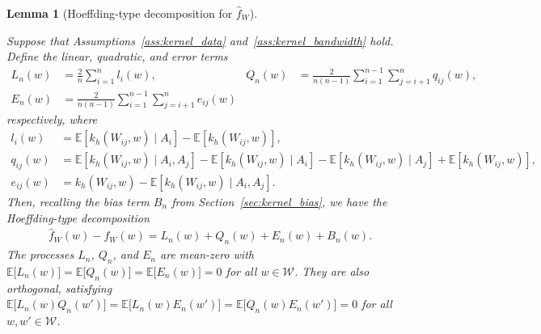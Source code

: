 \documentclass[11pt,lof]{puthesis}
\newcommand{\E}{\ensuremath{\mathbb{E}}}
\newcommand{\cW}{\ensuremath{\mathcal{W}}}
\theoremstyle{break}
\newtheorem{lemma}{Lemma}[section]
\theoremstyle{proof}
\begin{document}
\begin{lemma}[Hoeffding-type decomposition for $\hat f_W$]
\label{lem:kernel_hoeffding}

Suppose that Assumptions~\ref{ass:kernel_data} and~\ref{ass:kernel_bandwidth}
hold. Define the linear, quadratic, and error terms
%
\begin{align*}
L_n(w)
&=
\frac{2}{n} \sum_{i=1}^n l_i(w),
&Q_n(w) &= \frac{2}{n(n-1)} \sum_{i=1}^{n-1} \sum_{j=i+1}^{n} q_{i j}(w), \\
E_n(w) &= \frac{2}{n(n-1)} \sum_{i=1}^{n-1} \sum_{j=i+1}^{n} e_{i j}(w)
\end{align*}
%
respectively, where
%
\begin{align*}
l_i(w)
&=
\E\left[k_h(W_{i j},w) \mid A_i\right] - \E\left[k_h(W_{i j},w)\right], \\
q_{i j}(w)
&=
\E\left[k_h(W_{i j},w) \mid A_i, A_j\right]
- \E\left[k_h(W_{i j},w) \mid A_i\right]
- \E\left[k_h(W_{i j},w) \mid A_j\right]
+ \E\left[k_h(W_{i j},w)\right], \\
e_{i j}(w)
&=
k_h(W_{i j},w) - \E\left[k_h(W_{i j},w) \mid A_i, A_j\right].
\end{align*}
%
Then, recalling the bias term $B_n$ from Section~\ref{sec:kernel_bias},
we have the Hoeffding-type decomposition
%
\begin{align}
\label{eq:kernel_hoeffding}
\hat f_W(w) - f_W(w) = L_n(w) + Q_n(w) + E_n(w) + B_n(w).
\end{align}
%
The processes $L_n$, $Q_n$, and $E_n$ are mean-zero
with $\E\big[L_n(w)\big] = \E\big[Q_n(w)\big] = \E\big[E_n(w)\big] = 0$
for all $w \in \cW$. They are also orthogonal,
satisfying $\E\big[ L_n(w) Q_n(w') \big] = \E\big[ L_n(w) E_n(w') \big]
= \E\big[ Q_n(w) E_n(w') \big] = 0$ for all $w, w' \in \cW$.
%
\end{lemma}
\end{document}
